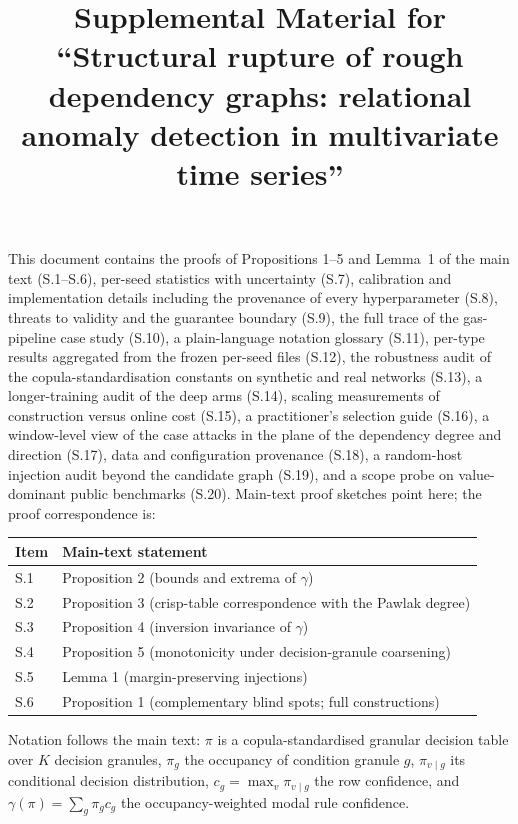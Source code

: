 \documentclass[11pt,a4paper]{article}
\begin{document}
\title{Supplemental Material for\\ ``Structural rupture of rough dependency
graphs: relational anomaly detection in multivariate time series''}
\date{}
\maketitle

\noindent This document contains the proofs of Propositions 1--5 and
Lemma~1 of the main text (S.1--S.6), per-seed statistics with
uncertainty (S.7), calibration and implementation details including the
provenance of every hyperparameter (S.8), threats to validity and the
guarantee boundary (S.9), the full trace of the gas-pipeline case study
(S.10), a plain-language notation glossary (S.11), per-type results
aggregated from the frozen per-seed files (S.12), the robustness
audit of the copula-standardisation constants on synthetic and real
networks (S.13), a longer-training audit of the deep arms (S.14),
scaling measurements of construction versus online cost (S.15), a
practitioner's selection guide (S.16), a window-level view of the
case attacks in the plane of the dependency degree and direction
(S.17), data and configuration provenance (S.18), a random-host
injection audit beyond the candidate graph (S.19), and a scope probe
on value-dominant public benchmarks (S.20). Main-text proof
sketches point here; the proof correspondence is:

\medskip
\noindent\begin{tabular}{@{}ll@{}}
\toprule
Item & Main-text statement \\
\midrule
S.1 & Proposition 2 (bounds and extrema of $\gamma$) \\
S.2 & Proposition 3 (crisp-table correspondence with the Pawlak degree) \\
S.3 & Proposition 4 (inversion invariance of $\gamma$) \\
S.4 & Proposition 5 (monotonicity under decision-granule coarsening) \\
S.5 & Lemma 1 (margin-preserving injections) \\
S.6 & Proposition 1 (complementary blind spots; full constructions) \\
\bottomrule
\end{tabular}
\medskip

\noindent Notation follows the main text: $\pi$ is a copula-standardised
granular decision table over $K$ decision granules, $\pi_g$ the occupancy
of condition granule $g$, $\pi_{v\mid g}$ its conditional decision
distribution, $c_g=\max_v \pi_{v\mid g}$ the row confidence, and
$\gamma(\pi)=\sum_g \pi_g c_g$ the occupancy-weighted modal rule
confidence.
\end{document}
